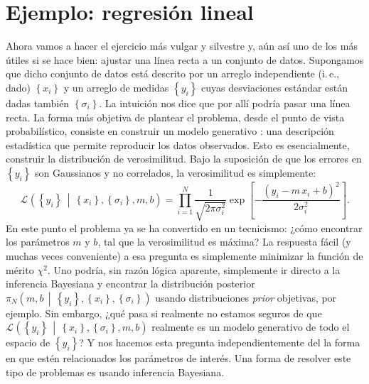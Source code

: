 \documentclass[a4paper,twoside]{article}
\newcommand{\pos}[2]{\ensuremath{\pi_N\left(#1\,\middle|\, #2\right)}\xspace}
\newcommand{\lik}[3][]{\ensuremath{\mathcal{L}_{#1}\left(#2\,\middle|\, #3\right)}\xspace}
\newcommand{\set}[1]{\ensuremath{\left\{#1\right\}}\xspace}
\begin{document}

\section{Ejemplo: regresión lineal}
%
Ahora vamos a hacer el ejercicio más vulgar y silvestre y, aún así uno de los más útiles si se hace
bien: ajustar una línea recta a un conjunto de datos. Supongamos que dicho conjunto de datos está
descrito por un arreglo independiente (i.\,e., dado) \(\set{x_i}\) y un arreglo de medidas
\(\set{y_i}\) cuyas desviaciones estándar están dadas también \(\set{\sigma_i}\).
La intuición nos dice que por allí podría pasar una línea recta. La forma más objetiva de plantear
el problema, desde el punto de vista probabilístico, consiste en construir un modelo generativo
\citep{Hogg2010}: una descripción estadística que permite reproducir los datos observados. Esto es
esencialmente, construir la distribución de verosimilitud. Bajo la suposición de que los errores en
\(\set{y_i}\) son Gaussianos y no correlados, la verosimilitud es simplemente:
%
\[\lik{\set{y_i}}{\set{x_i},\set{\sigma_i},m,b} = \prod_{i=1}^N\frac{1}{\sqrt{2\pi\sigma_i^2}}\exp{\left[-\frac{\left(y_i-m\,x_i+b\right)^2}{2\sigma_i^2}\right]}.\]
%
En este punto el problema ya se ha convertido en un tecnicismo: ¿cómo encontrar los parámetros \(m\)
y \(b\), tal que la verosimilitud es máxima? La respuesta fácil (y muchas veces conveniente) a esa
pregunta es simplemente minimizar la función de mérito \(\chi^2\).
Uno podría, sin razón lógica aparente, simplemente ir directo a la inferencia Bayesiana y encontrar
la distribución posterior \(\pos{m,b}{\set{y_i},\set{x_i},\set{\sigma_i}}\) usando distribuciones
\emph{prior} objetivas, por ejemplo.
Sin embargo, ¿qué pasa si realmente no estamos seguros de que
\(\lik{\set{y_i}}{\set{x_i},\set{\sigma_i},m,b}\) realmente es un modelo generativo de todo el
espacio de \(\set{y_i}\)? Y nos hacemos esta pregunta independientemente del la forma en que estén
relacionados los parámetros de interés.
Una forma de resolver este tipo de problemas es usando inferencia Bayesiana.
\end{document}
